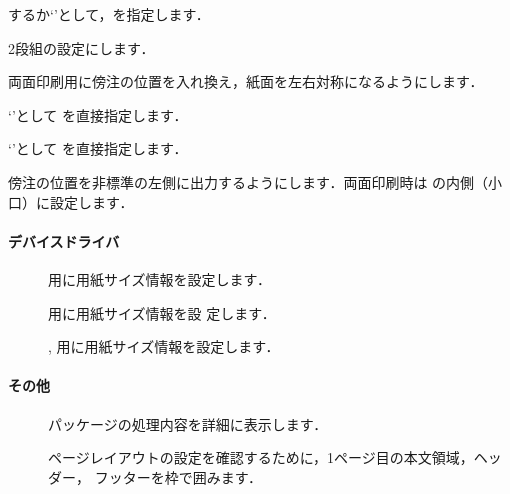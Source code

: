 \begin{description}
  するか`'として，を指定します．
 \item[\Option{twocolumn}]
  2段組の設定にします．
 \item[\Option{twoside}]
  両面印刷用に傍注の位置を入れ換え，紙面を左右対称になるようにします．
 \item[\Option{textwidth}]
  `'として  を直接指定します．
 \item[\Option{textheight}]
  `'として  を直接指定します．
 \item[\Option{reversemp}/\Option{reversemarginpar}]
 傍注の位置を非標準の左側に出力するようにします．両面印刷時は
 の内側（小口）に設定します．
\end{description}

\paragraph{デバイスドライバ}

\begin{description}
 \item[] 用に用紙サイズ情報を設定します．
 \item[] \Prog[dvipdfm]{\Dvipdfm}用に用紙サイズ情報を設
 定します．
 \item[] \Prog[pdftex]{\PDFTeX},
 \Prog[pdflatex]{\PDFLaTeX}用に用紙サイズ情報を設定します．
\end{description}

\paragraph{その他}

\begin{description}
 \item[] 
  パッケージの処理内容を詳細に表示します．
 \item[] 
  ページレイアウトの設定を確認するために，1ページ目の本文領域，ヘッダー，
  フッターを枠で囲みます．
\end{description}

